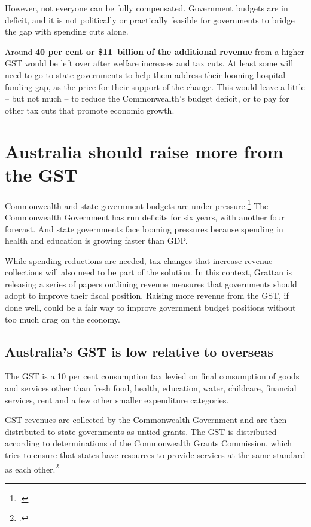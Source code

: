 \documentclass{grattanAlpha}
\begin{document}
\begin{overview}[-20pt]
However, not everyone can be fully compensated. Government budgets are in deficit, and it is not politically or practically feasible for governments to bridge the gap with spending cuts alone.

Around \textbf{40 per cent or \$11~billion of the additional revenue} from a higher GST would be left over after welfare increases and tax cuts. At least some will need to go to state governments to help them address their looming hospital funding gap, as the price for their support of the change. This would leave a little – but not much – to reduce the Commonwealth’s budget deficit, or to pay for other tax cuts that promote economic growth. 
\end{overview}
\addtolength{\columnsep}{-\overviewextra}
\contentspage

\chapter{Australia should raise more from the GST}\label{chapter:GST-1}
Commonwealth and state government budgets are under pressure.\footcite{DaleyWood2015FiscalChallenges}  The Commonwealth Government has run deficits for six years, with another four forecast. And state governments face looming pressures because spending in health and education is growing faster than GDP.

While spending reductions are needed, tax changes that increase revenue collections will also need to be part of the solution. In this context, Grattan is releasing a series of papers outlining revenue measures that governments should adopt to improve their fiscal position.  Raising more revenue from the GST, if done well, could be a fair way to improve government budget positions without too much drag on the economy. 

\section{Australia's\DEVIATION{} GST is low relative to overseas}\label{sec:GST-1-1}
The GST is a 10 per cent consumption tax levied on final consumption of goods and services other than fresh food, health, education, water, childcare, financial services, rent and a few other smaller expenditure categories. 

GST revenues are collected by the Commonwealth Government and are then distributed to state governments as untied grants. The GST is distributed according to determinations of the Commonwealth Grants Commission, which tries to ensure that states have resources to provide services at the same standard as each other.\footcite[][12]{CGC2015} 
\end{document}
